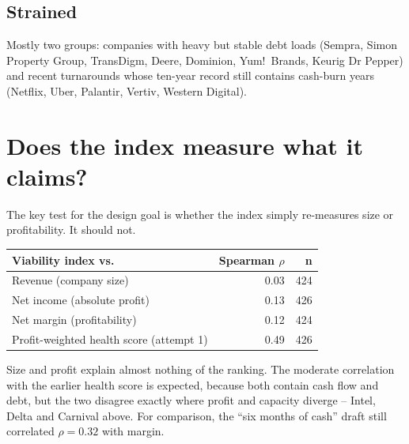\documentclass[11pt,a4paper]{article}
\begin{document}
\subsection{Strained}
Mostly two groups: companies with heavy but stable debt loads (Sempra, Simon Property Group, TransDigm, Deere, Dominion, Yum!\ Brands, Keurig Dr Pepper) and recent turnarounds whose ten-year record still contains cash-burn years (Netflix, Uber, Palantir, Vertiv, Western Digital).

\section{Does the index measure what it claims?}

The key test for the design goal is whether the index simply re-measures size or profitability. It should not.

\begin{center}
\begin{tabular}{@{}lrr@{}}
\toprule
Viability index vs. & Spearman $\rho$ & n \\
\midrule
Revenue (company size) & 0.03 & 424 \\
Net income (absolute profit) & 0.13 & 426 \\
Net margin (profitability) & 0.12 & 424 \\
Profit-weighted health score (attempt 1) & 0.49 & 426 \\
\bottomrule
\end{tabular}
\end{center}

Size and profit explain almost nothing of the ranking. The moderate correlation with the earlier health score is expected, because both contain cash flow and debt, but the two disagree exactly where profit and capacity diverge -- Intel, Delta and Carnival above. For comparison, the ``six months of cash'' draft still correlated $\rho = 0.32$ with margin.
\end{document}
